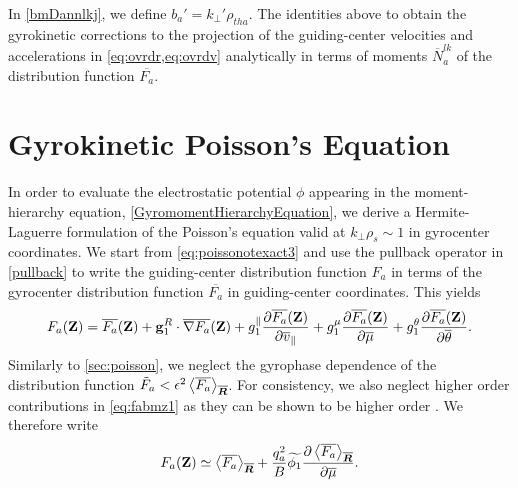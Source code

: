 %
In \cref{bmDannlkj}, we define $b_a'=k_\perp' \rho_{tha}$.
%
The identities above  to obtain the gyrokinetic corrections to the projection of the guiding-center velocities and accelerations in \cref{eq:ovrdr,eq:ovrdv} analytically in terms of moments $\overline N_a^{lk}$ of the distribution function $\overline{F_a}$.

\section{Gyrokinetic Poisson's Equation}
\label{sec:megk}

In order to evaluate the electrostatic potential $\phi$ appearing in the moment-hierarchy equation, \cref{GyromomentHierarchyEquation}, we derive a Hermite-Laguerre formulation of the Poisson's equation valid at $k_\perp \rho_s \sim 1$ in gyrocenter coordinates.
%
We start from \cref{eq:poissonotexact3} and use the pullback operator in \cref{pullback} to write the guiding-center distribution function $F_a$ in terms of the gyrocenter distribution function $\overline{F_a}$ in guiding-center coordinates.
%
This yields
%
\begin{equation}
    F_a(\mathbf Z) = \overline{F_a}(\mathbf Z) + \mathbf g_1^{R} \cdot \overline \nabla \overline{F_a}(\mathbf Z) + g^{\parallel}_1 \frac{\partial \overline{F_a}(\mathbf Z)}{\partial \overline v_\parallel} + g^{\mu}_1 \frac{\partial \overline{F_a}(\mathbf Z)}{\partial \overline \mu} + g^{\theta}_1 \frac{\partial \overline{F_a}(\mathbf Z)}{\partial \overline \theta}.
\label{eq:fabmz1}
\end{equation}
%
Similarly to \cref{sec:poisson}, we neglect the gyrophase dependence of the distribution function $\tilde F_a < \epsilon^2 \left< \overline{F_a}\right>_{\overline{\bm{R}}}$.
%
For consistency, we also neglect higher order contributions in \cref{eq:fabmz1} as they can be shown to be higher order  \citep{Hahm2009,Madsen2013}.
%
We therefore write
%
\begin{equation}
    F_a(\mathbf Z)\simeq \left< \overline{F_a} \right>_{\overline{\bm{R}}} + \frac{q_a^2}{B}\widetilde{\phi_1}\frac{\partial \left< \overline{F_a} \right>_{\overline{\bm{R}}}}{\partial \overline \mu}.
\label{eq:faag1}
\end{equation}

